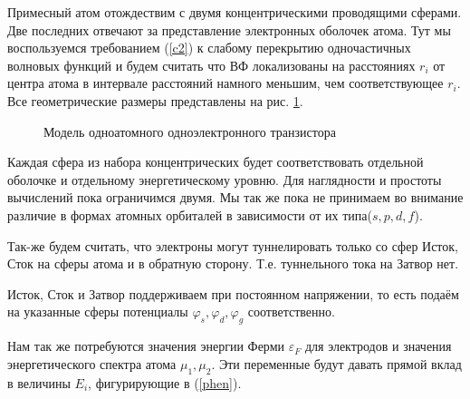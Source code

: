 \documentclass[12pt,a4paper]{report}
\begin{document}
Примесный атом отождествим с двумя концентрическими проводящими сферами. Две последних отвечают за представление электронных оболочек атома. Тут мы воспользуемся требованием (\ref{c2}) к слабому перекрытию одночастичных волновых функций и будем считать что ВФ локализованы на расстояниях $r_i$ от центра атома в интервале расстояний намного меньшим, чем соответствующее $r_i$. Все геометрические размеры представлены на рис. \ref{fig:SASET model}.
\begin{figure}[h]
	\caption{Модель одноатомного одноэлектронного транзистора}
	\label{fig:SASET model}
\end{figure}

Каждая сфера из набора концентрических будет соответствовать отдельной оболочке и отдельному энергетическому уровню. Для наглядности и простоты вычислений пока ограничимся двумя. Мы так же пока не принимаем во внимание различие в формах атомных орбиталей в зависимости от их типа($s,p,d,f$). 

Так-же будем считать, что электроны могут туннелировать только со сфер Исток, Сток на сферы атома и в обратную сторону. Т.е. туннельного тока на Затвор нет.

Исток, Сток и Затвор поддерживаем при постоянном напряжении, то есть подаём на указанные сферы потенциалы $\varphi_s, \varphi_d, \varphi_g$ соответственно.

Нам так же потребуются значения энергии Ферми $\varepsilon_F$ для электродов и значения энергетического спектра атома $\mu_1, \mu_2$. Эти переменные будут давать прямой вклад в величины $E_i$, фигурирующие в (\ref{phen}). 
\end{document}
